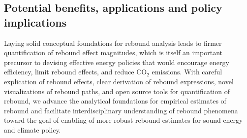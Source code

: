 \documentclass[12pt]{article}    %
\begin{document}
\subsection*{Potential benefits, applications and policy implications}
\label{sec:benefits}

Laying solid conceptual foundations for rebound analysis leads to 
firmer quantification of rebound effect magnitudes, 
which is itself an important precursor
to devising effective energy policies
that would 
encourage energy efficiency, 
limit rebound effects, and
reduce CO$_2$ emissions.
With
careful explication of rebound effects, 
clear derivation of rebound expressions, 
novel visualizations of rebound paths, and
open source tools for quantification of rebound,
we advance the analytical foundations for empirical estimates of rebound and
facilitate interdisciplinary understanding of rebound phenomena
toward the goal of enabling of more robust rebound estimates
for sound energy and climate policy.
\end{document}
